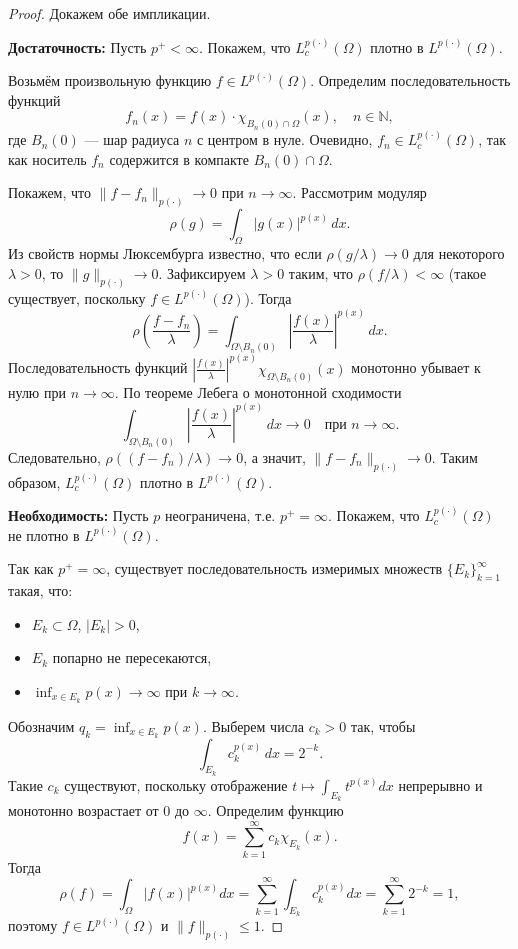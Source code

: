 \documentclass[../NDCNNAI_main.tex]{subfiles}
\begin{document}
\begin{proof}
Докажем обе импликации.

\noindent
\textbf{Достаточность: } Пусть \( p^+ < \infty \). Покажем, что \( L_c^{p(\cdot)}(\Omega) \) плотно в \( L^{p(\cdot)}(\Omega) \).

Возьмём произвольную функцию \( f \in L^{p(\cdot)}(\Omega) \). Определим последовательность функций
\[
f_n(x) = f(x) \cdot \chi_{B_n(0) \cap \Omega}(x), \quad n \in \mathbb{N},
\]
где \( B_n(0) \) --- шар радиуса \( n \) с центром в нуле. Очевидно, \( f_n \in L_c^{p(\cdot)}(\Omega) \), так как носитель \( f_n \) содержится в компакте \( B_n(0) \cap \Omega \).

Покажем, что \( \|f - f_n\|_{p(\cdot)} \to 0 \) при \( n \to \infty \). Рассмотрим модуляр
\[
\rho(g) = \int_\Omega |g(x)|^{p(x)} \, dx.
\]
Из свойств нормы Люксембурга известно, что если \( \rho(g/\lambda) \to 0 \) для некоторого \( \lambda > 0 \), то \( \|g\|_{p(\cdot)} \to 0 \). Зафиксируем \( \lambda > 0 \) таким, что \( \rho(f/\lambda) < \infty \) (такое существует, поскольку \( f \in L^{p(\cdot)}(\Omega) \)). Тогда
\[
\rho\left( \frac{f - f_n}{\lambda} \right) = \int_{\Omega \setminus B_n(0)} \left| \frac{f(x)}{\lambda} \right|^{p(x)} \, dx.
\]
Последовательность функций \( \left| \frac{f(x)}{\lambda} \right|^{p(x)} \chi_{\Omega \setminus B_n(0)}(x) \) монотонно убывает к нулю при \( n \to \infty \). По теореме Лебега о монотонной сходимости
\[
\int_{\Omega \setminus B_n(0)} \left| \frac{f(x)}{\lambda} \right|^{p(x)} \, dx \to 0 \quad \text{при } n \to \infty.
\]
Следовательно, \( \rho((f - f_n)/\lambda) \to 0 \), а значит, \( \|f - f_n\|_{p(\cdot)} \to 0 \). Таким образом, \( L_c^{p(\cdot)}(\Omega) \) плотно в \( L^{p(\cdot)}(\Omega) \).

\noindent
\textbf{Необходимость: } Пусть \( p \) неограничена, т.е. \( p^+ = \infty \). Покажем, что \( L_c^{p(\cdot)}(\Omega) \) не плотно в \( L^{p(\cdot)}(\Omega) \).

Так как \( p^+ = \infty \), существует последовательность измеримых множеств \( \{E_k\}_{k=1}^\infty \) такая, что:
\begin{itemize}
    \item \( E_k \subset \Omega \), \( |E_k| > 0 \),
    \item \( E_k \) попарно не пересекаются,
    \item \( \displaystyle \inf_{x \in E_k} p(x) \to \infty \) при \( k \to \infty \).
\end{itemize}
Обозначим \( q_k = \inf_{x \in E_k} p(x) \). Выберем числа \( c_k > 0 \) так, чтобы
\[
\int_{E_k} c_k^{p(x)} \, dx = 2^{-k}.
\]
Такие \( c_k \) существуют, поскольку отображение \( t \mapsto \int_{E_k} t^{p(x)} dx \) непрерывно и монотонно возрастает от 0 до \( \infty \). Определим функцию
\[
f(x) = \sum_{k=1}^\infty c_k \chi_{E_k}(x).
\]
Тогда
\[
\rho(f) = \int_\Omega |f(x)|^{p(x)} dx = \sum_{k=1}^\infty \int_{E_k} c_k^{p(x)} dx = \sum_{k=1}^\infty 2^{-k} = 1,
\]
поэтому \( f \in L^{p(\cdot)}(\Omega) \) и \( \|f\|_{p(\cdot)} \le 1 \).


\end{proof}
\end{document}
